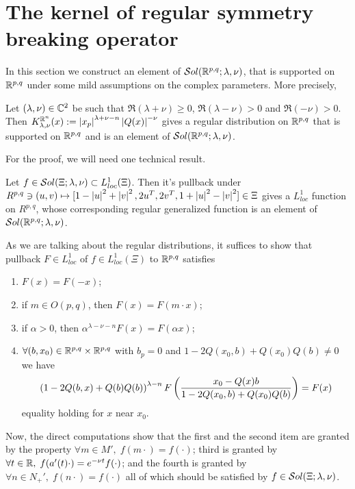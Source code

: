 \documentclass[10pt]{article} %
\theoremstyle{definition}
\theoremstyle{remark}
\begin{document}
\section{The kernel of regular symmetry breaking operator}
In this section we construct an element of $\sol$, that is supported on $\R^{ p,q }$ under some mild
assumptions on the complex parameters. More precisely,
\begin{myprop}
	Let $(\lambda,\nu)\in\C^2$ be such that $\Re(\lambda+\nu)\geq0$, $\Re(\lambda-\nu)>0$ and $\Re(-\nu)>0$. Then
	$K_{ \lambda,\nu }^{ \R^n }(x):=\myabs{ x_p}^{ \lambda+\nu-n }\myabs{ Q(x) }^{ -\nu }$ gives a regular distribution
	on $\R^{ p,q }$ that is supported on $\R^{ p,q }$ and is an element of $\sol$.
\end{myprop}
For the proof, we will need one technical result.
\begin{mylem}
	Let $f\in \sol[\Xi]\subset L^1_{loc}(\Xi)$. Then it's pullback under $R^{p,q}\ni(u,v)\mapsto
	[1-\myabs{ u }^2+\myabs{ v }^2,2u^T,2v^T,1+\myabs{ u }^2-\myabs{ v }^2]\in\Xi$ gives a $L^1_{loc}$ function
	on $R^{p,q}$, whose corresponding regular generalized function is an element of $\sol$.
\end{mylem}
\begin{myproof}
	As we are talking about the regular distributions, it suffices to show that pullback $F\in L^1_{loc}$
	of $f\in L^1_{loc}(\Xi)$ to $\R^{p,q}$
	satisfies
	\begin{enumerate}
		\item $F(x)=F(-x)$;
		\item if $m\in O(p,q)$, then $F(x)=F(m\cdot x)$;
		\item if $\alpha>0$, then $\alpha^{\lambda-\nu-n}F(x)=F(\alpha x)$;
		\item $\forall (b,x_0)\in\R^{ p,q }\times\R^{p,q}$ with $b_p=0$ and
				${ 1-2Q(x_0,b)+Q(x_0)Q(b) }\neq0$
				we have \[\mybra{ 1-2Q(b,x)+Q(b)Q(b) }^{ \lambda-n }F
				\mybra{\frac{ x_0-Q(x)b }{ 1-2Q(x_0,b)+Q(x_0)Q(b)}}=F(x)\] equality holding for $x$ near $x_0$.
	\end{enumerate}
	Now, the direct computations show that the first and the second item are granted by the property
	$\forall m\in M',\;f(m\cdot)=f(\cdot)$;
	third is granted by $\forall t\in\R,\;f(a'(t)\cdot)=e^{-\nu t}f(\cdot)$;
	and the fourth is granted by $\forall n\in N_+',\;f(n\cdot)=f(\cdot)$ all of which
	should be satisfied by $f\in\sol[\Xi]$.
\end{myproof}
\end{document}
